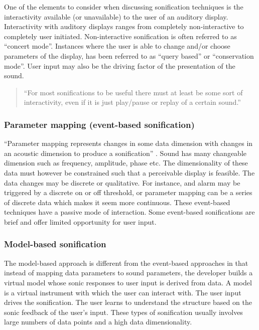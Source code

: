 One of the elements to consider when discussing sonification techniques is the interactivity available (or unavailable) to the user of an auditory display. 
Interactivity with auditory displays ranges from completely non-interactive to completely user initiated. 
Non-interactive sonification is often referred to as “concert mode”. 
Instances where the user is able to change and/or choose parameters of the display, has been referred to as “query based” or “conservation mode”. 
User input may also be the driving factor of the presentation of the sound. 

\begin{quote}
``For most sonifications to be useful there must at least be some sort of interactivity, even if it is just play/pause or replay of a certain sound.'' \cite*{Hermann2011}
\end{quote}



\subsubsection*{Parameter mapping (event-based sonification)} %
\label{ssub:parameter_mapping_event_based_sonification_}

``Parameter mapping represents changes in some data dimension with changes in an acoustic dimension to produce a sonification'' \cite*{Hermann2011}.
Sound has many changeable dimension such as frequency, amplitude, phase etc. 
The dimensionality of these data must however be constrained such that a perceivable display is feasible. 
The data changes may be discrete or qualitative. 
For instance, and alarm may be triggered by a discrete on or off threshold, or parameter mapping can be a series of discrete data which makes it seem more continuous. 
These event-based techniques have a passive mode of interaction. 
Some event-based sonifications are brief and offer limited opportunity for user input. 



\subsubsection*{Model-based sonification} %
\label{ssub:model_based_sonification}

The model-based approach is different from the event-based approaches in that instead of mapping data parameters to sound parameters, the developer builds a virtual model whose sonic responses to user input is derived from data. 
A model is a virtual instrument with which the user can interact with. 
The user input drives the sonification. 
The user learns to understand the structure based on the sonic feedback of the user’s input. 
These types of sonification usually involves large numbers of data points and a high data dimensionality.

